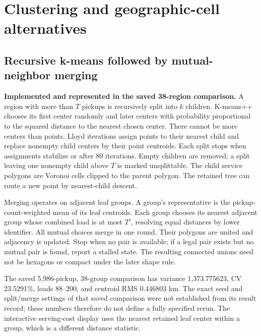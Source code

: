 \documentclass[11pt]{article}
\begin{document}
\section{Clustering and geographic-cell alternatives}
\subsection{Recursive k-means followed by mutual-neighbor merging}
\textbf{Implemented and represented in the saved 38-region comparison.}
A region with more than $T$ pickups is recursively split into $k$ children.
K-means++ chooses its first center randomly and later centers with probability
proportional to the squared distance to the nearest chosen center. There cannot
be more centers than points. Lloyd iterations assign points to their nearest
child and replace nonempty child centers by their point centroids. Each split
stops when assignments stabilize or after 80 iterations. Empty children are
removed; a split leaving one nonempty child above $T$ is marked unsplittable.
The child service polygons are Voronoi cells clipped to the parent polygon.
The retained tree can route a new point by nearest-child descent.

Merging operates on adjacent leaf groups. A group's representative is the
pickup-count-weighted mean of its leaf centroids. Each group chooses its nearest
adjacent group whose combined load is at most $T'$, resolving equal distances
by lower identifier. All mutual choices merge in one round. Their polygons are
united and adjacency is updated. Stop when no pair is available; if a legal pair
exists but no mutual pair is found, report a stalled state. The resulting
connected unions need not be hexagons or compact under the later shape rule.

The saved 5,986-pickup, 38-group comparison has variance 1,373.775623,
CV 23.5291\%, loads 88--200, and centroid RMS 0.446803 km.
The exact seed and split/merge settings of that saved comparison were not
established from its result record; these numbers therefore do not define a
fully specified rerun. The interactive serving-cost display uses the nearest
retained leaf center within a group, which is a different distance statistic.
\end{document}
